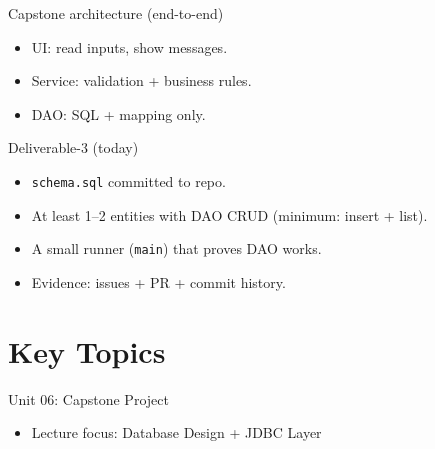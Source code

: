 \documentclass{beamer}
\begin{document}
\begin{frame}{Capstone architecture (end-to-end)}
  \centering

  \vspace{0.6em}
  \begin{itemize}[<+->]
    \item UI: read inputs, show messages.
    \item Service: validation + business rules.
    \item DAO: SQL + mapping only.
  \end{itemize}
  \slidesources{\OOPSUnitVISources}
\end{frame}

\begin{frame}{Deliverable-3 (today)}
  \begin{itemize}[<+->]
    \item \texttt{schema.sql} committed to repo.
    \item At least 1--2 entities with DAO CRUD (minimum: insert + list).
    \item A small runner (\texttt{main}) that proves DAO works.
    \item Evidence: issues + PR + commit history.
  \end{itemize}
  \slidesources{\OOPSUnitVISources}
\end{frame}

\section{Key Topics}
\label{sec:concepts}

\begin{frame}{Unit 06: Capstone Project}
  \begin{itemize}[<+->]
    \item Lecture focus: Database Design + JDBC Layer
  \end{itemize}
  \slidesources{\OOPSUnitVISources}
\end{frame}
\end{document}
